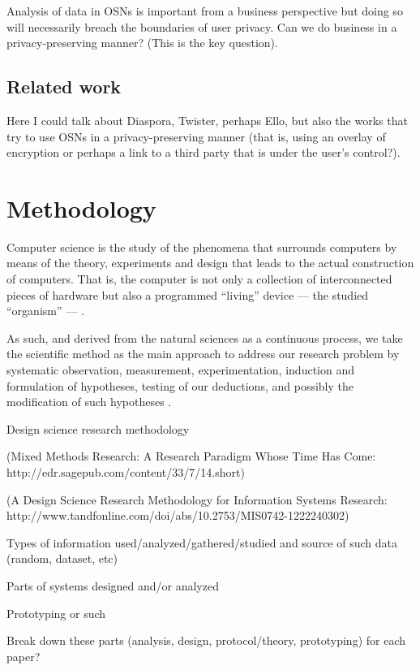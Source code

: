 \documentclass[showtrims]{kthesis}
\begin{document}
Analysis of data in OSNs is important from a business perspective but doing so will 
necessarily breach the boundaries of user privacy. Can we do business in a privacy-preserving 
manner? (This is the key question).

\section{Related work}

Here I could talk about Diaspora, Twister, perhaps Ello, but also the works that try to 
use OSNs in a privacy-preserving manner (that is, using an overlay of encryption 
or perhaps a link to a third party that is under the user's control?).

\chapter{Methodology}
Computer science is the study of the phenomena that surrounds computers by means 
of the theory, experiments and design that leads to the actual construction of computers. 
That is, the computer is not only a collection of interconnected pieces of hardware 
but also a programmed ``living'' device --- the studied ``organism'' --- \cite{NewellS76}.

As such, and derived from the natural sciences as a continuous process, we take 
the scientific method as the main approach to address our research problem by systematic 
observation, measurement, experimentation, induction and formulation of hypotheses, 
testing of our deductions, and possibly the modification of such hypotheses \cite{Oxford14}.


Design science research methodology

(Mixed Methods Research: A Research Paradigm Whose Time Has Come: http://edr.sagepub.com/content/33/7/14.short)

(A Design Science Research Methodology for Information Systems Research: http://www.tandfonline.com/doi/abs/10.2753/MIS0742-1222240302)

Types of information used/analyzed/gathered/studied and source of such data (random, dataset, etc)

Parts of systems designed and/or analyzed

Prototyping or such

Break down these parts (analysis, design, protocol/theory, prototyping) for each 
paper?
\end{document}
